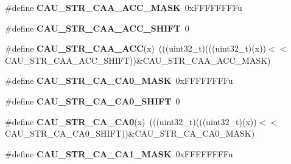 \begin{DoxyCompactItemize}
\item 
\#define {\bfseries C\+A\+U\+\_\+\+S\+T\+R\+\_\+\+C\+A\+A\+\_\+\+A\+C\+C\+\_\+\+M\+A\+SK}~0x\+F\+F\+F\+F\+F\+F\+F\+Fu\hypertarget{group__CAU__Register__Masks_gafdeac08a5e2a414586e6cfb318a3beca}{}\label{group__CAU__Register__Masks_gafdeac08a5e2a414586e6cfb318a3beca}

\item 
\#define {\bfseries C\+A\+U\+\_\+\+S\+T\+R\+\_\+\+C\+A\+A\+\_\+\+A\+C\+C\+\_\+\+S\+H\+I\+FT}~0\hypertarget{group__CAU__Register__Masks_gaad9cefe85fb570468c92429a601f3c30}{}\label{group__CAU__Register__Masks_gaad9cefe85fb570468c92429a601f3c30}

\item 
\#define {\bfseries C\+A\+U\+\_\+\+S\+T\+R\+\_\+\+C\+A\+A\+\_\+\+A\+CC}(x)~(((uint32\+\_\+t)(((uint32\+\_\+t)(x))$<$$<$C\+A\+U\+\_\+\+S\+T\+R\+\_\+\+C\+A\+A\+\_\+\+A\+C\+C\+\_\+\+S\+H\+I\+FT))\&C\+A\+U\+\_\+\+S\+T\+R\+\_\+\+C\+A\+A\+\_\+\+A\+C\+C\+\_\+\+M\+A\+SK)\hypertarget{group__CAU__Register__Masks_ga4866a4555a25ed3cc3d5b1270b619834}{}\label{group__CAU__Register__Masks_ga4866a4555a25ed3cc3d5b1270b619834}

\item 
\#define {\bfseries C\+A\+U\+\_\+\+S\+T\+R\+\_\+\+C\+A\+\_\+\+C\+A0\+\_\+\+M\+A\+SK}~0x\+F\+F\+F\+F\+F\+F\+F\+Fu\hypertarget{group__CAU__Register__Masks_ga7490044c911fb60ad77baacec88b73a0}{}\label{group__CAU__Register__Masks_ga7490044c911fb60ad77baacec88b73a0}

\item 
\#define {\bfseries C\+A\+U\+\_\+\+S\+T\+R\+\_\+\+C\+A\+\_\+\+C\+A0\+\_\+\+S\+H\+I\+FT}~0\hypertarget{group__CAU__Register__Masks_ga80d0808b0ed4fd4b825e2409ecc79ce7}{}\label{group__CAU__Register__Masks_ga80d0808b0ed4fd4b825e2409ecc79ce7}

\item 
\#define {\bfseries C\+A\+U\+\_\+\+S\+T\+R\+\_\+\+C\+A\+\_\+\+C\+A0}(x)~(((uint32\+\_\+t)(((uint32\+\_\+t)(x))$<$$<$C\+A\+U\+\_\+\+S\+T\+R\+\_\+\+C\+A\+\_\+\+C\+A0\+\_\+\+S\+H\+I\+FT))\&C\+A\+U\+\_\+\+S\+T\+R\+\_\+\+C\+A\+\_\+\+C\+A0\+\_\+\+M\+A\+SK)\hypertarget{group__CAU__Register__Masks_ga499b6aa3c87a5c219ee34ffec4b8c807}{}\label{group__CAU__Register__Masks_ga499b6aa3c87a5c219ee34ffec4b8c807}

\item 
\#define {\bfseries C\+A\+U\+\_\+\+S\+T\+R\+\_\+\+C\+A\+\_\+\+C\+A1\+\_\+\+M\+A\+SK}~0x\+F\+F\+F\+F\+F\+F\+F\+Fu\hypertarget{group__CAU__Register__Masks_gaf5468a65fe021f5053a4d9fa83c77614}{}\label{group__CAU__Register__Masks_gaf5468a65fe021f5053a4d9fa83c77614}


\end{DoxyCompactItemize}
